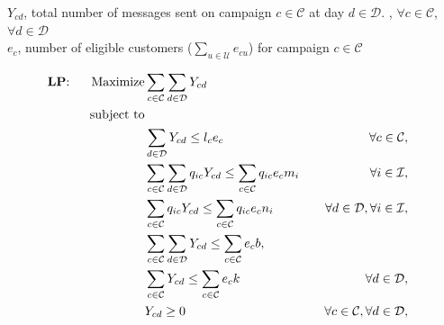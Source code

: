 \documentclass[11pt]{article}
\begin{document}
\noindent $Y_{{c}{d}}$, total number of messages sent on campaign $c \in \mathcal{C}$ at day $d \in \mathcal{D}$.
, $\forall c \in \mathcal{C}$, $\forall d \in \mathcal{D}$ \\
\noindent $e_{c}$, number of eligible customers ($\sum\limits_{u\in\mathcal{U}}e_{{c}{u}}$) for campaign $c \in \mathcal{C}$

\begin{align}
\text{\textbf{LP}: \;\;\;\;\;}\text{Maximize} & \displaystyle
\sum\limits_{c\in \mathcal{C}}
\sum\limits_{d\in \mathcal{D}}
Y_{{c}{d}} \label{mathmodel2_obj}&
\\
\text{subject to} \notag\\
&\sum\limits_{d\in\mathcal{D}}Y_{{c}{d}} \leq l_{c}  e_{c} &&&\forall c \in \mathcal{C}, \label{mathmodel2_campaignlimit}&\\
&\sum\limits_{c\in\mathcal{C}}\sum\limits_{d\in\mathcal{D}} q_{{i}{c}} Y_{{c}{d}}\leq \sum\limits_{c\in\mathcal{C}}q_{{i}{c}} e_{c}  m_{i} &&&\forall i \in \mathcal{I}, \label{mathmodel2_weeklyquotalimit}&\\
&\sum\limits_{c\in\mathcal{C}}q_{{i}{c}} Y_{{c}{d}} \leq \sum\limits_{c\in\mathcal{C}}q_{{i}{c}} e_{c} n_{i} &&&\forall d \in \mathcal{D}, \forall i \in \mathcal{I}, \label{mathmodel2_dailyquotalimit}&\\
&\sum\limits_{c\in\mathcal{C}}\sum\limits_{d\in\mathcal{D}}Y_{{c}{d}} \leq \sum\limits_{c\in\mathcal{C}}e_{c}  b, \label{mathmodel2_weeklylimit}&\\
&\sum\limits_{c\in\mathcal{C}}Y_{{c}{d}} \leq \sum\limits_{c\in\mathcal{C}}e_{c} k &&&\forall d \in \mathcal{D},\label{mathmodel2_dailylimit}&\\
&Y_{{c}{d}} \geq 0&&&\forall c \in \mathcal{C}, \forall d \in \mathcal{D}, \label{mathmodel2_positive}
\end{align}
\end{document}

